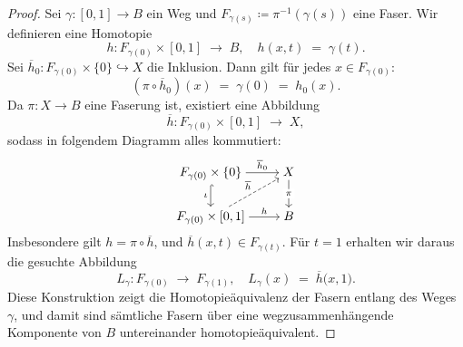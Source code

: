 \documentclass[12pt]{article}
\numberwithin{conj}{section}
\begin{document}
        \begin{proof}
            Sei \(\gamma : [0,1] \to B\) ein Weg und \(F_{\gamma(s)} \coloneqq \pi^{-1}(\gamma(s))\) eine Faser. Wir definieren eine Homotopie
            \[
                h : F_{\gamma(0)} \times [0,1] \;\longrightarrow\; B,
                \quad
                h(x,t) \;=\; \gamma(t).
            \]
            Sei \(\overline{h}_0 : F_{\gamma(0)} \times \{0\} \hookrightarrow X\) die Inklusion. Dann gilt für jedes \(x \in F_{\gamma(0)}\):
            \[
                (\pi \circ \overline{h}_0)(x) \;=\; \gamma(0)
                \;=\;
                h_0(x).
            \]
            Da \(\pi : X \to B\) eine Faserung ist, existiert eine Abbildung
            \[
                \overline{h} : F_{\gamma(0)} \times [0,1] \;\longrightarrow\; X,
            \]
            sodass in folgendem Diagramm alles kommutiert:
            \[\begin{tikzcd}[cramped]
                {F_{\gamma(0)}\times\{0\}} & X \\
                {F_{\gamma(0)}\times[0,1]} & B
                \arrow["{\overline{h}_0}", from=1-1, to=1-2]
                \arrow["\iota"', hook, from=1-1, to=2-1]
                \arrow["\pi"{description}, from=1-2, to=2-2]
                \arrow["{\overline{h}}", dashed, from=2-1, to=1-2]
                \arrow["h", from=2-1, to=2-2]
                \end{tikzcd}\]
                Insbesondere gilt \(h = \pi \circ \overline{h}\), und \(\overline{h}(x,t) \in F_{\gamma(t)}\). Für \(t=1\) erhalten wir daraus die gesuchte Abbildung
                \[
                    L_\gamma : F_{\gamma(0)} \;\longrightarrow\; F_{\gamma(1)},
                    \quad
                    L_\gamma(x) \;=\; \overline{h}\bigl(x,1\bigr).
                \]
                Diese Konstruktion zeigt die Homotopieäquivalenz der Fasern entlang des Weges \(\gamma\), und damit sind sämtliche Fasern über eine wegzusammenhängende Komponente von \(B\) untereinander homotopieäquivalent.
                \end{proof}
                
\end{document}

